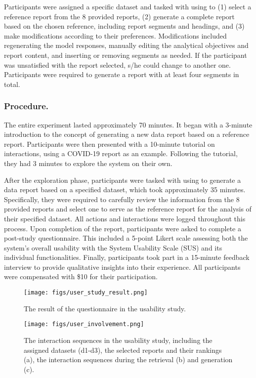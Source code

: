 Participants were assigned a specific dataset and tasked with using \system{} to (1) select a reference report from the 8 provided reports, (2) generate a complete report based on the chosen reference, including report segments and headings, and (3) make modifications according to their preferences. 
Modifications included regenerating the model responses, manually editing the analytical objectives and report content, and inserting or removing segments as needed. 
If the participant was unsatisfied with the report selected, s/he could change to another one.
Participants were required to generate a report with at least four segments in total.

\subsubsection{Procedure. }
The entire experiment lasted approximately 70 minutes. 
It began with a 3-minute introduction to the concept of generating a new data report based on a reference report. 
Participants were then presented with a 10-minute tutorial on \system{} interactions, using a COVID-19 report as an example. 
Following the tutorial, they had 3 minutes to explore the system on their own. 

After the exploration phase, participants were tasked with using \system{} to generate a data report based on a specified dataset, which took approximately 35 minutes. 
Specifically, they were required to carefully review the information from the 8 provided reports and select one to serve as the reference report for the analysis of their specified dataset. 
All actions and interactions were logged throughout this process. 
Upon completion of the report, participants were asked to complete a post-study questionnaire. 
This included a 5-point Likert scale assessing both the system's overall usability with the System Usability Scale (SUS) and its individual functionalities. 
Finally, participants took part in a 15-minute feedback interview to provide qualitative insights into their experience. 
All participants were compensated with \$10 for their participation.

\begin{figure*}[!htb] 
  \centering
  \texttt{[image: figs/user\_study\_result.png]}
  \caption{The result of the questionnaire in the usability study. }
  \label{fig:user_study_result}
\end{figure*}

\begin{figure*}[!htb] 
  \centering
  \texttt{[image: figs/user\_involvement.png]}
  \caption{The interaction sequences in the usability study, including the assigned datasets (d1-d3), the selected reports and their rankings (a), the interaction sequences during the retrieval (b) and generation (c). }
  \label{fig:user_involvement}
\end{figure*}


